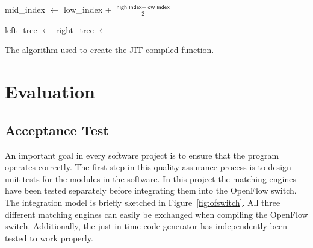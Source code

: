 \documentclass[a4paper,
		12pt,
		parskip=full,
		titlepage
		]{scrartcl}
\begin{document}
\begin{algorithm}
\begin{algorithmic}
    \State mid\_index $\gets$ low\_index + $\frac{\textsf{high\_index} - \textsf{low\_index}}{2}$
    
     
        \State {}
        \State {}
        \State {}
        \State {} 
        \State {}
    \EndIf
    
    \State left\_tree $\gets$ 
    \State right\_tree $\gets$ 
    
    \State {}
    \State {}
    \State {}
    \State {}
    \State {}
    \State {}
    \State {}
    \State {}
\EndFunction
\end{algorithmic}
\caption{The algorithm used to create the JIT-compiled function.}
\label{alg:jit}
\end{algorithm}

\section{Evaluation}
\subsection{Acceptance Test}
An important goal in every software project is to ensure that the program operates correctly.
The first step in this quality assurance process is to design unit tests for the modules in the software.
In this project the matching engines have been tested separately before integrating them into the OpenFlow switch.
The integration model is briefly sketched in Figure~\ref{fig:ofswitch}.
All three different matching engines can easily be exchanged when compiling the OpenFlow switch.
Additionally, the just in time code generator has independently been tested to work properly.
\end{document}
